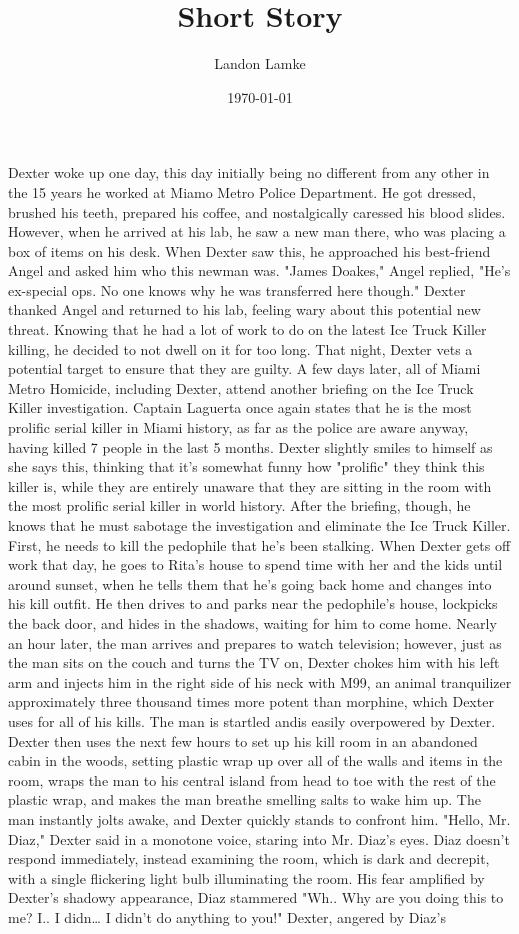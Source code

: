 \documentclass[12pt, letterpaper]{article}
\title{Short Story}
\author{Landon Lamke}
\date{\today}
\begin{document}
\maketitle

Dexter woke up one day, this day initially being no different from any other in the 15 years he worked at Miamo Metro Police Department. He got dressed, brushed his teeth, prepared his coffee, and nostalgically caressed his blood slides. However, when he arrived at his lab, he saw a new man there, who was placing a box of items on his desk. When Dexter saw this, he approached his best-friend Angel and asked him who this newman was. "James Doakes," Angel replied, "He's ex-special ops. No one knows why he was transferred here though." Dexter thanked Angel and returned to his lab, feeling wary about this potential new threat. Knowing that he had a lot of work to do on the latest Ice Truck Killer killing, he decided to not dwell on it for too long. That night, Dexter vets a potential target to ensure that they are guilty. A few days later, all of Miami Metro Homicide, including Dexter, attend another briefing on the Ice Truck Killer investigation. Captain Laguerta once again states that he is the most prolific serial killer in Miami history, as far as the police are aware anyway, having killed 7 people in the last 5 months. Dexter slightly smiles to himself as she says this, thinking that it's somewhat funny how "prolific" they think this killer is, while they are entirely unaware that they are sitting in the room with the most prolific serial killer in world history. After the briefing, though, he knows that he must sabotage the investigation and eliminate the Ice Truck Killer. First, he needs to kill the pedophile that he's been stalking. When Dexter gets off work that day, he goes to Rita's house to spend time with her and the kids until around sunset, when he tells them that he's going back home and changes into his kill outfit. He then drives to and parks near the pedophile's house, lockpicks the back door, and hides in the shadows, waiting for him to come home. Nearly an hour later, the man arrives and prepares to watch television; however, just as the man sits on the couch and turns the TV on, Dexter chokes him with his left arm and injects him in the right side of his neck with M99, an animal tranquilizer approximately three thousand times more potent than morphine, which Dexter uses for all of his kills. The man is startled andis easily overpowered by Dexter. Dexter then uses the next few hours to set up his kill room in an abandoned cabin in the woods, setting plastic wrap up over all of the walls and items in the room, wraps the man to his central island from head to toe with the rest of the plastic wrap, and makes the man breathe smelling salts to wake him up. The man instantly jolts awake, and Dexter quickly stands to confront him. "Hello, Mr. Diaz," Dexter said in a monotone voice, staring into Mr. Diaz's eyes. Diaz doesn't respond immediately, instead examining the room, which is dark and decrepit, with a single flickering light bulb illuminating the room. His fear amplified by Dexter's shadowy appearance, Diaz stammered "Wh.. Why are you doing this to me? I.. I didn… I didn't do anything to you!" Dexter, angered by Diaz's 
\end{document}
